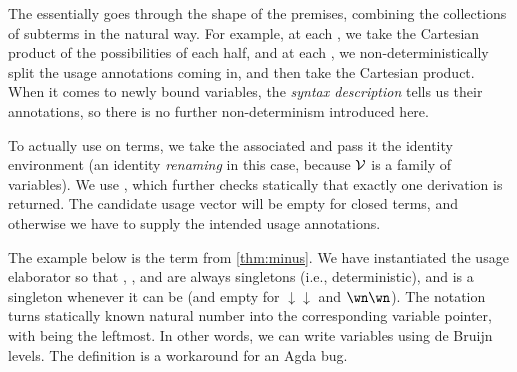 
The  essentially goes through the shape of the premises,
combining the collections of subterms in the natural way.
For example, at each
\AgdaInductiveConstructor{\AgdaUnderscore{}$\dottimes$\AgdaUnderscore{}},
we take the Cartesian product of the possibilities of each half, and at each
\AgdaInductiveConstructor{\AgdaUnderscore{}$\sep$\AgdaUnderscore{}},
we non-deterministically split the usage annotations coming in, and then take
the Cartesian product.
When it comes to newly bound variables, the \emph{syntax description} tells us
their annotations, so there is no further non-determinism introduced here.


To actually use  on terms, we take the associated
 and pass it the identity environment (an identity
\emph{renaming} in this case, because $\mathcal V$ is a family of variables).
We use , which further
checks statically that exactly one derivation is returned.
The candidate usage vector  will be empty for closed terms, and
otherwise we have to supply the intended usage annotations.

The example below is the term from \cref{thm:minus}.
We have instantiated the usage elaborator so that ,
, and  are always singletons (i.e.,
deterministic), and  is a singleton whenever it can be
(and empty for $\downarrow\downarrow$ and $\wn\wn$).
The notation \AgdaFunction{\#}\AgdaSpace{} turns statically known
natural number  into the corresponding variable pointer, with
 being the leftmost.
In other words, we can write variables using de Bruijn levels.
The definition  is a workaround for an Agda bug.

